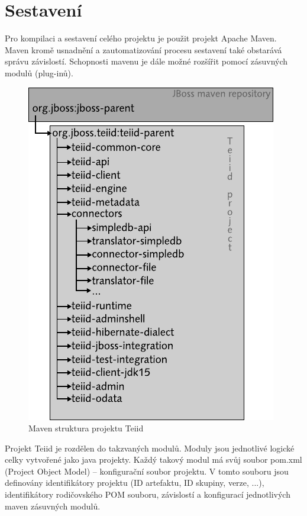 \documentclass[oneside,12pt,final]{fithesis2}
\begin{document}
\section{Sestavení}
Pro kompilaci a sestavení celého projektu je použit projekt Apache Maven. Maven kromě usnadnění a zautomatizování procesu sestavení také obstarává správu závislostí. Schopnosti mavenu je dále možné rozšířit pomocí zásuvných modulů (plug-inů).
\begin{figure}[h]
 \centering
 \includegraphics[scale=1]{mavenStructure}
 \caption{Maven struktura projektu Teiid}
\end{figure}

Projekt Teiid je rozdělen do takzvaných modulů. Moduly jsou jednotlivé logické celky vytvořené jako java projekty. Každý takový modul má svůj soubor pom.xml (Project Object Model) -- konfigurační soubor projektu. V tomto souboru jsou definovány identifikátory projektu (ID artefaktu, ID skupiny, verze, ...), identifikátory rodičovského POM souboru, závislostí a konfigurací jednotlivých maven zásuvných modulů.
\end{document}
